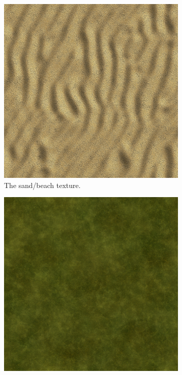 \begin{figure}[H]
\begin{subfigure}{\textwidth/3}
  \centering
  \includegraphics[width=0.9\linewidth]{images/textureSand.jpg}
  \caption{The sand/beach texture.}
  \label{fig:textureSand}
\end{subfigure}%
\begin{subfigure}{\textwidth/3}
  \centering
  \includegraphics[width=0.9\linewidth]{images/textureGrass.jpg}

\end{subfigure}
\end{figure}

